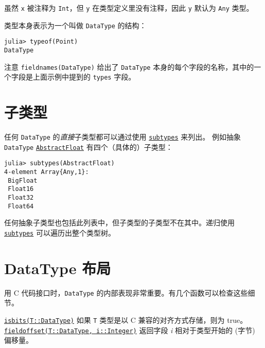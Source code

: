虽然 \texttt{x} 被注释为 \texttt{Int}，但 \texttt{y} 在类型定义里没有注释，因此 \texttt{y} 默认为 \texttt{Any} 类型。



类型本身表示为一个叫做 \texttt{DataType} 的结构：




\begin{verbatim}
julia> typeof(Point)
DataType
\end{verbatim}



注意 \texttt{fieldnames(DataType)} 给出了 \texttt{DataType} 本身的每个字段的名称，其中的一个字段是上面示例中提到的 \texttt{types} 字段。



\hypertarget{13277644863207512265}{}


\section{子类型}



任何 \texttt{DataType} 的\emph{直接}子类型都可以通过使用 \hyperlink{13112219412833772146}{\texttt{subtypes}} 来列出。 例如抽象 \texttt{DataType} \hyperlink{11465394427882483091}{\texttt{AbstractFloat}} 有四个（具体的）子类型：




\begin{verbatim}
julia> subtypes(AbstractFloat)
4-element Array{Any,1}:
 BigFloat
 Float16
 Float32
 Float64
\end{verbatim}



任何抽象子类型也包括此列表中，但子类型的子类型不在其中。递归使用 \hyperlink{13112219412833772146}{\texttt{subtypes}} 可以遍历出整个类型树。



\hypertarget{7724659828636149961}{}


\section{DataType 布局}



用 C 代码接口时，\texttt{DataType} 的内部表现非常重要。有几个函数可以检查这些细节。



\hyperlink{12980593021531333073}{\texttt{isbits(T::DataType)}} 如果 \texttt{T} 类型是以 C 兼容的对齐方式存储，则为 true。    \hyperlink{6956980533195055227}{\texttt{fieldoffset(T::DataType, i::Integer)}} 返回字段 \emph{i} 相对于类型开始的 (字节) 偏移量。



